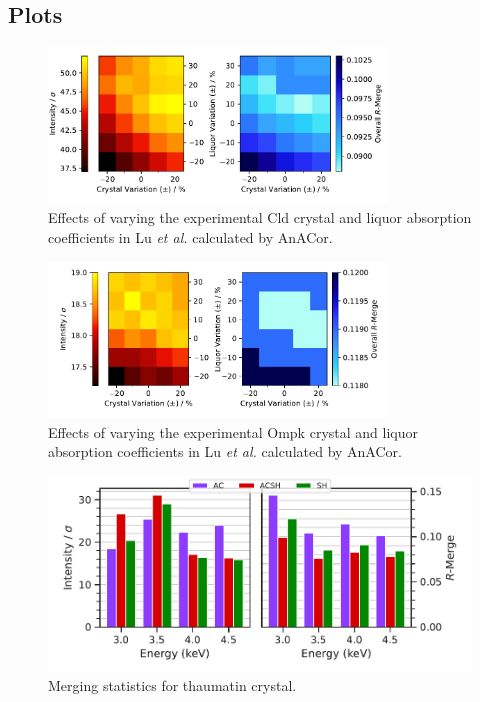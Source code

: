 \newpage
\subsection{Plots}

\begin{figure}[h]
    \centering
    \includegraphics[width = 0.8\textwidth]{plots/exp0/cld_merged_stats.pdf} 
    \caption{Effects of varying the experimental Cld crystal and liquor absorption coefficients in Lu \textit{et al.} \cite{Lu2024} calculated by AnACor.}
    \label{fig:cld_stats}
\end{figure}

\begin{figure}[h]
    \centering
    \includegraphics[width = 0.8\textwidth]{plots/exp0/ompk_merged_stats.pdf}
    \caption{Effects of varying the experimental Ompk crystal and liquor absorption coefficients in Lu \textit{et al.} \cite{Lu2024} calculated by AnACor.}
    \label{fig:ompk_stats}
\end{figure}



\begin{figure}[h]
    \centering
    \includegraphics{plots/exp0/thaum_stats_grid.pdf}
    \caption{Merging statistics for thaumatin crystal.}
    \label{fig:thaum1_stats}
\end{figure}


